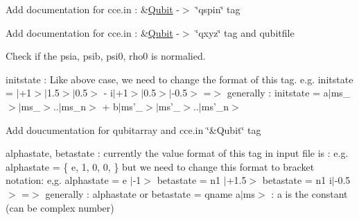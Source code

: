 \begin{DoxyRefList}
\item[\label{todo__todo000018}%
\hypertarget{todo__todo000018}{}%
Member \hyperlink{structQubit_a858930b7d9d9cafc70f26ab7993dadad}{Qubit\-:\-:spin} ]Add documentation for cce.\-in \-: \&\hyperlink{structQubit}{Qubit} -\/$>$ \char`\"{}qspin\char`\"{} tag  
\item[\label{todo__todo000020}%
\hypertarget{todo__todo000020}{}%
Member \hyperlink{structQubit_a799cb32b473160eb8e9e4aa6c9c39b18}{Qubit\-:\-:xyz} \mbox{[}3\mbox{]}]Add documentation for cce.\-in \-: \&\hyperlink{structQubit}{Qubit} -\/$>$ \char`\"{}qxyz\char`\"{} tag and qubitfile  
\item[\label{todo__todo000015}%
\hypertarget{todo__todo000015}{}%
Class \hyperlink{structQubitArray}{Qubit\-Array} ]Check if the psia, psib, psi0, rho0 is normalied. 

initstate \-: Like above case, we need to change the format of this tag. e.\-g. initstate = $|$+1$>$$|$1.5$>$$|$0.5$>$ -\/ i$|$+1$>$$|$0.5$>$$|$-\/0.5$>$ =$>$ generally \-: initstate = a$|$ms\-\_$>$$|$ms\-\_$>$..$|$ms\-\_\-n$>$ + b$|$ms'\-\_$>$$|$ms'\-\_$>$..$|$ms'\-\_\-n$>$ 

Add doucumentation for qubitarray and cce.\-in \char`\"{}\&\-Qubit\char`\"{} tag 

alphastate, betastate \-: currently the value format of this tag in input file is \-: e.\-g. alphastate = \{ e, 1, 0, 0, \} but we need to change this format to bracket notation\-: e,g. alphastate = e $|$-\/1$>$ betastate = n1 $|$+1.5$>$ betastate = n1 i$|$-\/0.5$>$ =$>$ generally \-: alphastate or betastate = qname a$|$ms$>$ \-: a is the constant (can be complex number) 
\end{DoxyRefList}